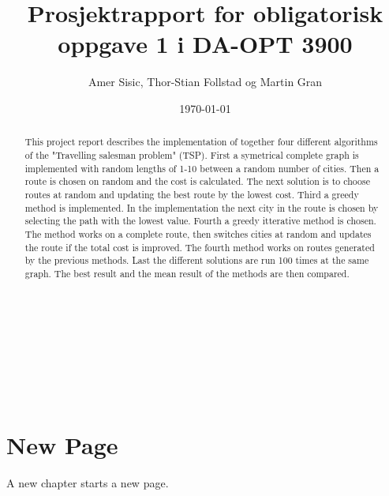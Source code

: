 \documentclass[notitlepage]{report}
\title{Prosjektrapport for obligatorisk oppgave 1 i DA-OPT 3900}
\author{Amer Sisic, Thor-Stian Follstad og Martin Gran}
\date{\today}
\begin{document}
\maketitle
\thispagestyle{empty}
\vspace{\fill}
\begin{abstract}
This project report describes the implementation of together four different algorithms of the "Travelling salesman problem" (TSP).
First a symetrical complete graph is implemented with random lengths of 1-10 between a random number of cities. Then a route is 
chosen on random and the cost is calculated. The next solution is to choose routes at random and updating the best route by the 
lowest cost. Third a greedy method is implemented. In the implementation the next city in the route is chosen by selecting
the path with the lowest value. Fourth a greedy itterative method is chosen. The method works on a complete route, then switches
cities at random and updates the route if the total cost is improved. The fourth method works on routes generated by the previous
methods. Last the different solutions are run 100 times at the same graph. The best result and the mean result of the methods are then compared.  
\\ \\ \\ \\ \\ \\ \\ \\ \\
\end{abstract}
\vspace{\fill}


\chapter{New Page}
A new chapter starts a new page.  
\end{document}

